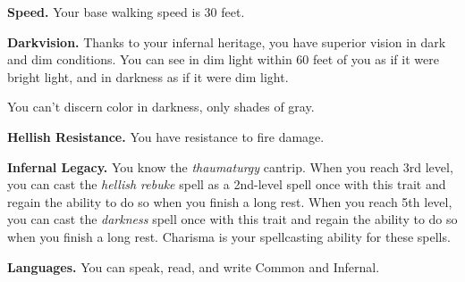 \documentclass[
]{article}
\begin{document}
\textbf{Speed.} Your base walking speed is 30 feet.

\textbf{Darkvision.} Thanks to your infernal heritage, you have superior
vision in dark and dim conditions. You can see in dim light within 60
feet of you as if it were bright light, and in darkness as if it were
dim light.

You can't discern color in darkness, only shades of gray.

\textbf{Hellish Resistance.} You have resistance to fire damage.

\textbf{Infernal Legacy.} You know the \emph{thaumaturgy} cantrip. When
you reach 3rd level, you can cast the \emph{hellish rebuke} spell as a
2nd-level spell once with this trait and regain the ability to do so
when you finish a long rest. When you reach 5th level, you can cast the
\emph{darkness} spell once with this trait and regain the ability to do
so when you finish a long rest. Charisma is your spellcasting ability
for these spells.

\textbf{Languages.} You can speak, read, and write Common and Infernal.
\end{document}

